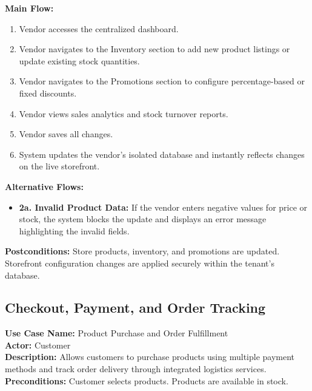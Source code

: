 \vspace{0.2cm}
\textbf{Main Flow:} 
\begin{enumerate}
    \item Vendor accesses the centralized dashboard.
    \item Vendor navigates to the Inventory section to add new product listings or update existing stock quantities.
    \item Vendor navigates to the Promotions section to configure percentage-based or fixed discounts.
    \item Vendor views sales analytics and stock turnover reports.
    \item Vendor saves all changes.
    \item System updates the vendor's isolated database and instantly reflects changes on the live storefront.
\end{enumerate}

\textbf{Alternative Flows:}
\begin{itemize}
    \item \textbf{2a. Invalid Product Data:} If the vendor enters negative values for price or stock, the system blocks the update and displays an error message highlighting the invalid fields.
\end{itemize}

\vspace{0.2cm}
\textbf{Postconditions:} Store products, inventory, and promotions are updated. Storefront configuration changes are applied securely within the tenant's database.


\vspace{0.5cm}
\subsection{Checkout, Payment, and Order Tracking}
\textbf{Use Case Name:} Product Purchase and Order Fulfillment\\
\textbf{Actor:} Customer\\
\textbf{Description:} Allows customers to purchase products using multiple payment methods and track order delivery through integrated logistics services.\\
\textbf{Preconditions:} Customer selects products. Products are available in stock.

